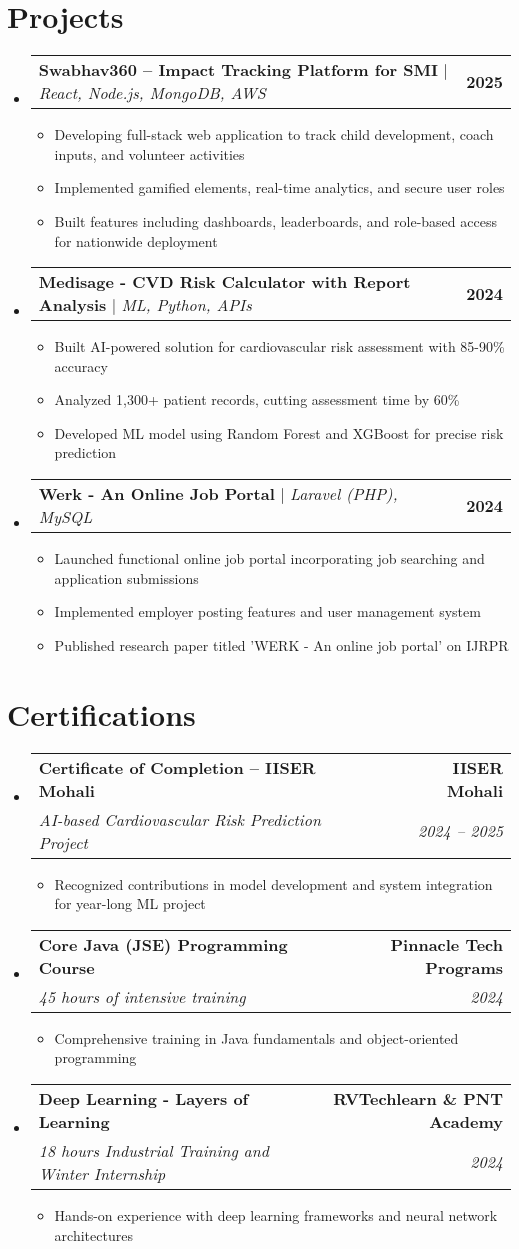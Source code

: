 \documentclass[letterpaper,11pt]{article}
\makeatletter
\newcommand{\resumeItem}[1]{
  \item\small{
    {#1 \vspace{-2pt}}
  }
}
\newcommand{\resumeSubheading}[4]{
  \vspace{-2pt}\item
    \begin{tabular*}{1.0\textwidth}[t]{l@{\extracolsep{\fill}}r}
      \textbf{#1} & \textbf{\small #2} \\
      \textit{\small#3} & \textit{\small #4} \\
    \end{tabular*}\vspace{-7pt}
}
\newcommand{\resumeProjectHeading}[2]{
    \item
    \begin{tabular*}{1.001\textwidth}{l@{\extracolsep{\fill}}r}
      \small#1 & \textbf{\small #2}\\
    \end{tabular*}\vspace{-7pt}
}
\newcommand{\resumeSubHeadingListStart}{\begin{itemize}[leftmargin=0.0in, label={}]}
\newcommand{\resumeSubHeadingListEnd}{\end{itemize}}
\newcommand{\resumeItemListStart}{\begin{itemize}}
\newcommand{\resumeItemListEnd}{\end{itemize}\vspace{-5pt}}
\makeatother
\begin{document}
\section{Projects}
    \vspace{-5pt}
    \resumeSubHeadingListStart
      \resumeProjectHeading
          {\textbf{Swabhav360 -- Impact Tracking Platform for SMI} $|$ \emph{React, Node.js, MongoDB, AWS}}{2025}
          \resumeItemListStart
            \resumeItem{Developing full-stack web application to track child development, coach inputs, and volunteer activities}
            \resumeItem{Implemented gamified elements, real-time analytics, and secure user roles}
            \resumeItem{Built features including dashboards, leaderboards, and role-based access for nationwide deployment}
          \resumeItemListEnd
          \vspace{-13pt}
      \resumeProjectHeading
          {\textbf{Medisage - CVD Risk Calculator with Report Analysis} $|$ \emph{ML, Python, APIs}}{2024}
          \resumeItemListStart
            \resumeItem{Built AI-powered solution for cardiovascular risk assessment with 85-90\% accuracy}
            \resumeItem{Analyzed 1,300+ patient records, cutting assessment time by 60\%}
            \resumeItem{Developed ML model using Random Forest and XGBoost for precise risk prediction}
          \resumeItemListEnd 
          \vspace{-13pt}
      \resumeProjectHeading
          {\textbf{Werk - An Online Job Portal} $|$ \emph{Laravel (PHP), MySQL}}{2024}
          \resumeItemListStart
            \resumeItem{Launched functional online job portal incorporating job searching and application submissions}
            \resumeItem{Implemented employer posting features and user management system}
            \resumeItem{Published research paper titled 'WERK - An online job portal' on IJRPR}
          \resumeItemListEnd
    \resumeSubHeadingListEnd
\vspace{-15pt}

\section{Certifications}
    \resumeSubHeadingListStart
      \resumeSubheading
        {Certificate of Completion -- IISER Mohali}{IISER Mohali}
        {AI-based Cardiovascular Risk Prediction Project}{2024 -- 2025}
        \resumeItemListStart
          \resumeItem{Recognized contributions in model development and system integration for year-long ML project}
        \resumeItemListEnd
      \resumeSubheading
        {Core Java (JSE) Programming Course}{Pinnacle Tech Programs}
        {45 hours of intensive training}{2024}
        \resumeItemListStart
          \resumeItem{Comprehensive training in Java fundamentals and object-oriented programming}
        \resumeItemListEnd
      \resumeSubheading
        {Deep Learning - Layers of Learning}{RVTechlearn \& PNT Academy}
        {18 hours Industrial Training and Winter Internship}{2024}
        \resumeItemListStart
          \resumeItem{Hands-on experience with deep learning frameworks and neural network architectures}
        \resumeItemListEnd
    \resumeSubHeadingListEnd
\end{document}
